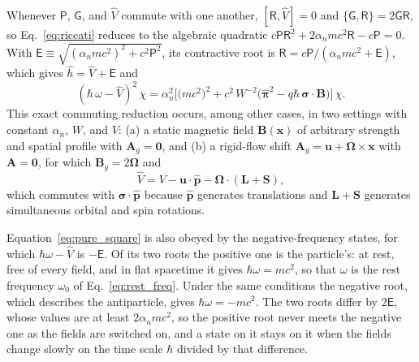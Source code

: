 \documentclass[aps,prd,onecolumn,tightenlines,nofootinbib,notitlepage,11pt,floatfix]{revtex4-2}
\theoremstyle{indentedtheorem}
\begin{document}
Whenever $\mathsf{P}$, $\mathsf{G}$, and $\hat{V}$ commute with one another, $[\mathsf{R},\hat{V}]=0$ and $\{\mathsf{G},\mathsf{R}\}=2\mathsf{G}\mathsf{R}$, so Eq.~\eqref{eq:riccati} reduces to the algebraic quadratic $c\mathsf{P}\mathsf{R}^2 + 2\alpha_nmc^2\mathsf{R} - c\mathsf{P} = 0$. With $\mathsf{E} \equiv \sqrt{(\alpha_nmc^2)^2+c^2\mathsf{P}^2}$, its contractive root is $\mathsf{R} = c\mathsf{P}/(\alpha_nmc^2+\mathsf{E})$, which gives $\hat{h} = \hat{V} + \mathsf{E}$ and
\begin{equation}
    (\hbar\,\omega - \hat{V})^2\,\chi = \alpha_n^2\Big[\big(mc^2\big)^2 + c^2\,W^{-2}\big(\hat{\boldsymbol{\pi}}^2 - q\hbar\,\boldsymbol{\sigma}\cdot\mathbf{B}\big)\Big]\,\chi .
    \label{eq:pure_square}
\end{equation}
This exact commuting reduction occurs, among other cases, in two settings with constant $\alpha_n$, $W$, and $V$: (a) a static magnetic field $\mathbf{B}(\mathbf{x})$ of arbitrary strength and spatial profile with $\mathbf{A}_g=\mathbf{0}$, and (b) a rigid-flow shift $\mathbf{A}_g = \mathbf{u} + \boldsymbol{\Omega}\times\mathbf{x}$ with $\mathbf{A}=\mathbf{0}$, for which $\mathbf{B}_g = 2\boldsymbol{\Omega}$ and
\begin{equation}
    \hat{V} = V - \mathbf{u}\cdot\hat{\mathbf{p}} - \boldsymbol{\Omega}\cdot(\mathbf{L}+\mathbf{S}) ,
    \label{eq:rigid_potential}
\end{equation}
which commutes with $\boldsymbol{\sigma}\cdot\hat{\mathbf{p}}$ because $\hat{\mathbf{p}}$ generates translations and $\mathbf{L}+\mathbf{S}$ generates simultaneous orbital and spin rotations.

Equation~\eqref{eq:pure_square} is also obeyed by the negative-frequency states, for which $\hbar\omega-\hat{V}$ is $-\mathsf{E}$. Of its two roots the positive one is the particle's: at rest, free of every field, and in flat spacetime it gives $\hbar\omega=mc^2$, so that $\omega$ is the rest frequency $\omega_0$ of Eq.~\eqref{eq:rest_freq}. Under the same conditions the negative root, which describes the antiparticle, gives $\hbar\omega=-mc^2$. The two roots differ by $2\mathsf{E}$, whose values are at least $2\alpha_nmc^2$, so the positive root never meets the negative one as the fields are switched on, and a state on it stays on it when the fields change slowly on the time scale $\hbar$ divided by that difference.
\end{document}
